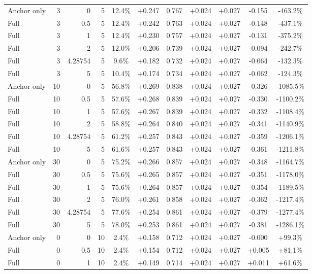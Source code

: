 \begin{table}[htbp]
\begin{tabular}{lrrrccccccc}
Anchor only & 3 & 0 & 5 & 12.4\% & +0.247 & 0.767 & +0.024 & +0.027 & -0.155 & -463.2\% \\
Full & 3 & 0.5 & 5 & 12.4\% & +0.242 & 0.763 & +0.024 & +0.027 & -0.148 & -437.1\% \\
Full & 3 & 1 & 5 & 12.4\% & +0.230 & 0.757 & +0.024 & +0.027 & -0.131 & -375.2\% \\
Full & 3 & 2 & 5 & 12.0\% & +0.206 & 0.739 & +0.024 & +0.027 & -0.094 & -242.7\% \\
Full & 3 & 4.28754 & 5 & 9.6\% & +0.182 & 0.732 & +0.024 & +0.027 & -0.064 & -132.3\% \\
Full & 3 & 5 & 5 & 10.4\% & +0.174 & 0.734 & +0.024 & +0.027 & -0.062 & -124.3\% \\
Anchor only & 10 & 0 & 5 & 56.8\% & +0.269 & 0.838 & +0.024 & +0.027 & -0.326 & -1085.5\% \\
Full & 10 & 0.5 & 5 & 57.6\% & +0.268 & 0.839 & +0.024 & +0.027 & -0.330 & -1100.2\% \\
Full & 10 & 1 & 5 & 57.6\% & +0.267 & 0.839 & +0.024 & +0.027 & -0.332 & -1108.4\% \\
Full & 10 & 2 & 5 & 58.8\% & +0.264 & 0.840 & +0.024 & +0.027 & -0.341 & -1140.9\% \\
Full & 10 & 4.28754 & 5 & 61.2\% & +0.257 & 0.843 & +0.024 & +0.027 & -0.359 & -1206.1\% \\
Full & 10 & 5 & 5 & 61.6\% & +0.257 & 0.843 & +0.024 & +0.027 & -0.361 & -1211.8\% \\
Anchor only & 30 & 0 & 5 & 75.2\% & +0.266 & 0.857 & +0.024 & +0.027 & -0.348 & -1164.7\% \\
Full & 30 & 0.5 & 5 & 75.6\% & +0.265 & 0.857 & +0.024 & +0.027 & -0.351 & -1178.0\% \\
Full & 30 & 1 & 5 & 75.6\% & +0.264 & 0.857 & +0.024 & +0.027 & -0.354 & -1189.5\% \\
Full & 30 & 2 & 5 & 76.0\% & +0.261 & 0.858 & +0.024 & +0.027 & -0.362 & -1217.4\% \\
Full & 30 & 4.28754 & 5 & 77.6\% & +0.254 & 0.861 & +0.024 & +0.027 & -0.379 & -1277.4\% \\
Full & 30 & 5 & 5 & 78.0\% & +0.253 & 0.861 & +0.024 & +0.027 & -0.381 & -1286.1\% \\
Anchor only & 0 & 0 & 10 & 2.4\% & +0.158 & 0.712 & +0.024 & +0.027 & -0.000 & +99.3\% \\
Full & 0 & 0.5 & 10 & 2.4\% & +0.154 & 0.712 & +0.024 & +0.027 & +0.005 & +81.1\% \\
Full & 0 & 1 & 10 & 2.4\% & +0.149 & 0.714 & +0.024 & +0.027 & +0.011 & +61.6\% \\

\end{tabular}
\end{table}
